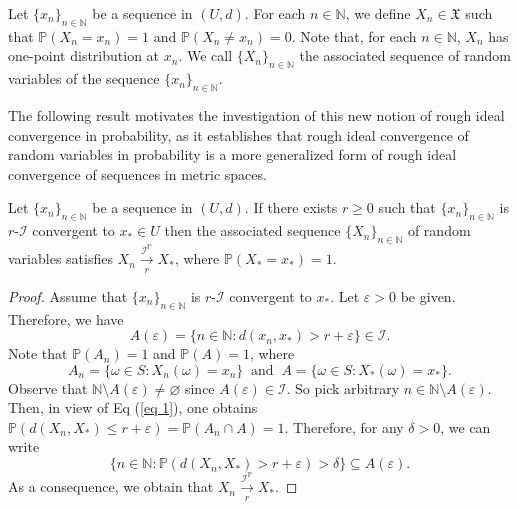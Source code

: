 \documentclass[reqno]{amsart}
\begin{document}
	\begin{remark}\label{impremark}
		Let $\{x_n\}_{n\in\mathbb{N}}$ be a sequence in $(U,d)$. For each $n\in\mathbb{N}$, we define $X_n\in\mathfrak{X}$ such that $\mathbb{P}(X_n=x_n)=1$ and $\mathbb{P}(X_n\neq x_n)=0$.
		 Note that, for each $n\in\mathbb{N}$, $X_n$ has one-point distribution at $x_n$. We call $\{X_n\}_{n\in\mathbb{N}}$ the associated sequence of random variables of the sequence $\{x_n\}_{n\in\mathbb{N}}$.
	\end{remark}
	The following result motivates the investigation of this new notion of rough ideal convergence in probability, as it establishes that rough ideal convergence of random variables in probability is a more generalized form of rough ideal convergence of sequences in metric spaces.
	\begin{proposition}
		Let $\{x_n\}_{n\in\mathbb{N}}$ be a sequence in $(U,d)$. If there exists $r\geq 0$ such that $\{x_n\}_{n\in\mathbb{N}}$ is $r$-$\mathcal{I}$ convergent to $x_*\in U$ then the associated sequence $\{X_n\}_{n\in\mathbb{N}}$ of random variables  satisfies $X_n\xrightarrow[r]{\mathcal{I}^{\mathbb{P}}} X_*$, where $\mathbb{P}(X_*=x_*)=1$.
	\end{proposition}
	\begin{proof}
	Assume that $\{x_n\}_{n\in\mathbb{N}}$ is $r$-$\mathcal{I}$ convergent to $x_*$. Let $\varepsilon>0$ be given. Therefore, we have
	\begin{equation}\label{eq 1}
		A(\varepsilon)=\{n\in\mathbb{N}:d(x_n,x_*)>r+\varepsilon\}\in\mathcal{I}.
	\end{equation}
	Note that $\mathbb{P}(A_n)=1$ and $\mathbb{P}(A)=1$, where 
	$$A_n=\{\omega\in S: X_n(\omega)=x_n\}~\mbox{ and }~A=\{\omega\in S: X_*(\omega)=x_*\}.$$
 Observe that $\mathbb{N}\setminus A(\varepsilon)\neq\varnothing$ since $A(\varepsilon)\in \mathcal{I}$. So pick arbitrary $n\in \mathbb{N}\setminus A(\varepsilon)$. Then, in view of Eq (\ref{eq 1}), one obtains $\mathbb{P}(d(X_n,X_*)\leq r+\varepsilon)=\mathbb{P}(A_n\cap A)=1$. Therefore, for any $\delta>0$, we can write 
	$$\{n\in\mathbb{N}:\mathbb{P}(d(X_n,X_*)> r+\varepsilon)>\delta\}\subseteq A(\varepsilon).$$
	As a consequence, we obtain that $X_n\xrightarrow[r]{\mathcal{I}^{\mathbb{P}}} X_*$.
	\end{proof}
	
\end{document}
